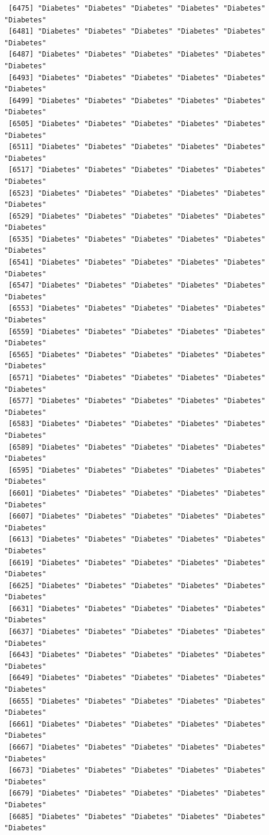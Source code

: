 \documentclass[
  letterpaper,
  DIV=11,
  numbers=noendperiod]{scrartcl}
\begin{document}
\begin{verbatim}
 [6475] "Diabetes" "Diabetes" "Diabetes" "Diabetes" "Diabetes" "Diabetes"
 [6481] "Diabetes" "Diabetes" "Diabetes" "Diabetes" "Diabetes" "Diabetes"
 [6487] "Diabetes" "Diabetes" "Diabetes" "Diabetes" "Diabetes" "Diabetes"
 [6493] "Diabetes" "Diabetes" "Diabetes" "Diabetes" "Diabetes" "Diabetes"
 [6499] "Diabetes" "Diabetes" "Diabetes" "Diabetes" "Diabetes" "Diabetes"
 [6505] "Diabetes" "Diabetes" "Diabetes" "Diabetes" "Diabetes" "Diabetes"
 [6511] "Diabetes" "Diabetes" "Diabetes" "Diabetes" "Diabetes" "Diabetes"
 [6517] "Diabetes" "Diabetes" "Diabetes" "Diabetes" "Diabetes" "Diabetes"
 [6523] "Diabetes" "Diabetes" "Diabetes" "Diabetes" "Diabetes" "Diabetes"
 [6529] "Diabetes" "Diabetes" "Diabetes" "Diabetes" "Diabetes" "Diabetes"
 [6535] "Diabetes" "Diabetes" "Diabetes" "Diabetes" "Diabetes" "Diabetes"
 [6541] "Diabetes" "Diabetes" "Diabetes" "Diabetes" "Diabetes" "Diabetes"
 [6547] "Diabetes" "Diabetes" "Diabetes" "Diabetes" "Diabetes" "Diabetes"
 [6553] "Diabetes" "Diabetes" "Diabetes" "Diabetes" "Diabetes" "Diabetes"
 [6559] "Diabetes" "Diabetes" "Diabetes" "Diabetes" "Diabetes" "Diabetes"
 [6565] "Diabetes" "Diabetes" "Diabetes" "Diabetes" "Diabetes" "Diabetes"
 [6571] "Diabetes" "Diabetes" "Diabetes" "Diabetes" "Diabetes" "Diabetes"
 [6577] "Diabetes" "Diabetes" "Diabetes" "Diabetes" "Diabetes" "Diabetes"
 [6583] "Diabetes" "Diabetes" "Diabetes" "Diabetes" "Diabetes" "Diabetes"
 [6589] "Diabetes" "Diabetes" "Diabetes" "Diabetes" "Diabetes" "Diabetes"
 [6595] "Diabetes" "Diabetes" "Diabetes" "Diabetes" "Diabetes" "Diabetes"
 [6601] "Diabetes" "Diabetes" "Diabetes" "Diabetes" "Diabetes" "Diabetes"
 [6607] "Diabetes" "Diabetes" "Diabetes" "Diabetes" "Diabetes" "Diabetes"
 [6613] "Diabetes" "Diabetes" "Diabetes" "Diabetes" "Diabetes" "Diabetes"
 [6619] "Diabetes" "Diabetes" "Diabetes" "Diabetes" "Diabetes" "Diabetes"
 [6625] "Diabetes" "Diabetes" "Diabetes" "Diabetes" "Diabetes" "Diabetes"
 [6631] "Diabetes" "Diabetes" "Diabetes" "Diabetes" "Diabetes" "Diabetes"
 [6637] "Diabetes" "Diabetes" "Diabetes" "Diabetes" "Diabetes" "Diabetes"
 [6643] "Diabetes" "Diabetes" "Diabetes" "Diabetes" "Diabetes" "Diabetes"
 [6649] "Diabetes" "Diabetes" "Diabetes" "Diabetes" "Diabetes" "Diabetes"
 [6655] "Diabetes" "Diabetes" "Diabetes" "Diabetes" "Diabetes" "Diabetes"
 [6661] "Diabetes" "Diabetes" "Diabetes" "Diabetes" "Diabetes" "Diabetes"
 [6667] "Diabetes" "Diabetes" "Diabetes" "Diabetes" "Diabetes" "Diabetes"
 [6673] "Diabetes" "Diabetes" "Diabetes" "Diabetes" "Diabetes" "Diabetes"
 [6679] "Diabetes" "Diabetes" "Diabetes" "Diabetes" "Diabetes" "Diabetes"
 [6685] "Diabetes" "Diabetes" "Diabetes" "Diabetes" "Diabetes" "Diabetes"

\end{verbatim}
\end{document}
